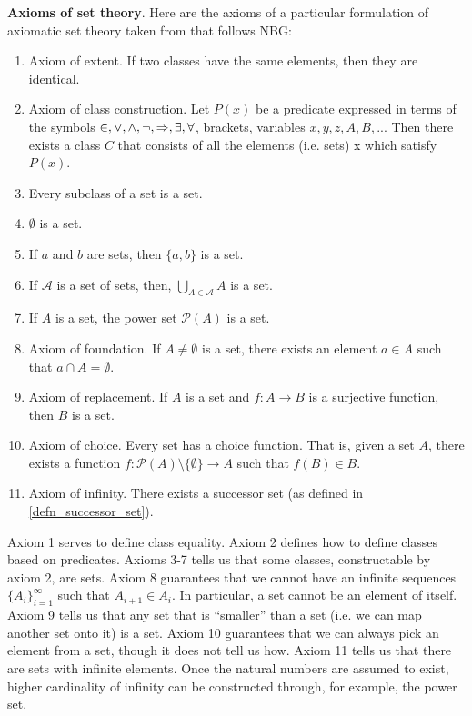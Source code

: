 \documentclass{article}
\newcommand{\marginleft}[1] {\reversemarginpar\marginpar{#1}}
\begin{document}
\textbf{Axioms of set theory}. Here \marginleft{Set theory axioms} are the axioms of a particular formulation of axiomatic set theory taken from \cite{pinter2014book} that follows NBG:
\begin{enumerate}
	\item Axiom of extent. If two classes have the same elements, then they are identical.
	\item Axiom of class construction. Let $P(x)$ be a predicate expressed in terms of the symbols $\in, \vee, \wedge, \neg, \Rightarrow, \exists, \forall$, brackets, variables $x, y, z, A, B, ...$ Then there exists a class $C$ that consists of all the elements (i.e. sets) x which satisfy $P(x)$.
	\item Every subclass of a set is a set.
	\item $\emptyset$ is a set.
	\item If $a$ and $b$ are sets, then $\{a, b\}$ is a set.
	\item If $\mathcal{A}$ is a set of sets, then, $\bigcup\limits_{A \in \mathcal{A}} A$ is a set.
	\item If $A$ is a set, the power set $\mathcal{P}(A)$ is a set.
	\item Axiom of foundation. If $A \neq \emptyset$ is a set, there exists an element $a \in A$ such that $a \cap A = \emptyset$.
	\item Axiom of replacement. If $A$ is a set and $f : A \to B$ is a surjective function, then $B$ is a set.
	\item Axiom of choice. Every set has a choice function. That is, given a set $A$, there exists a function $f : \mathcal{P}(A) \setminus \{ \emptyset \} \to A$ such that $f(B) \in B$.
	\item Axiom of infinity. There exists a successor set (as defined in \ref{defn_successor_set}).
\end{enumerate}


\begin{remark}
	Axiom 1 serves to define class equality. Axiom 2 defines how to define classes based on predicates. Axioms 3-7 tells us that some classes, constructable by axiom 2, are sets. Axiom 8 guarantees that we cannot have an infinite sequences $\{ A_i \}_{i=1}^\infty$ such that $A_{i+1} \in A_i$. In particular, a set cannot be an element of itself. Axiom 9 tells us that any set that is ``smaller'' than a set (i.e. we can map another set onto it) is a set. Axiom 10 guarantees that we can always pick an element from a set, though it does not tell us how. Axiom 11 tells us that there are sets with infinite elements. Once the natural numbers are assumed to exist, higher cardinality of infinity can be constructed through, for example, the power set.
\end{remark}
\end{document}
